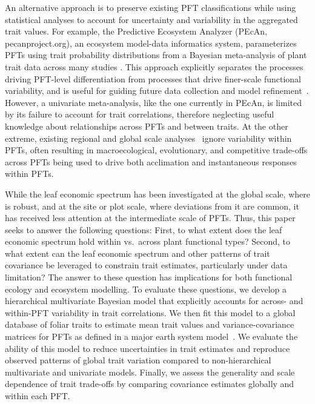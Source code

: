 An alternative approach is to preserve existing PFT classifications%
\cite[though potentially with finer taxonomic, functional, or spatial resolution, e.g.][]{boulangeat_improving_2012}
while using statistical analyses to account for uncertainty and variability in the aggregated trait values.
For example, the Predictive Ecosystem Analyzer (PEcAn, pecanproject.org), an ecosystem model-data informatics system, parameterizes PFTs using trait probability distributions from a Bayesian meta-analysis of plant trait data across many studies%
\cite{dietze_improving_2013,lebauer_facilitating_2013}.
This approach explicitly separates the processes driving PFT-level differentiation from processes that drive finer-scale functional variability,
and is useful for guiding future data collection and model refinement~\cite{dietze_quantitative_2014}.
However, a univariate meta-analysis, like the one currently in PEcAn, is limited by its failure to account for trait correlations, therefore neglecting useful knowledge about relationships across PFTs and between traits.
At the other extreme, existing regional and global scale analyses~\cite[e.g.][]{van_bodegom_going_2012,sakschewski_leaf_2015} ignore variability within PFTs, often resulting in macroecological, evolutionary, and competitive trade-offs across PFTs being used to drive both acclimation and instantaneous responses within PFTs.

While the leaf economic spectrum has been investigated at the global scale, where is robust, and at the site or plot scale, where deviations from it are common, it has received less attention at the intermediate scale of PFTs.
Thus, this paper seeks to answer the following questions:
First, to what extent does the leaf economic spectrum hold within vs.\ across plant functional types?
Second, to what extent can the leaf economic spectrum and other patterns of trait covariance be leveraged to constrain trait estimates, particularly under data limitation?
The answer to these question has implications for both functional ecology and ecosystem modelling.
To evaluate these questions, we develop a hierarchical multivariate Bayesian model that explicitly accounts for across- and within-PFT variability in trait correlations.
We then fit this model to a global database of foliar traits to estimate mean trait values and variance-covariance matrices for PFTs as defined in a major earth system model~\cite[Community Land Model, CLM,][]{clm45_note}.
We evaluate the ability of this model to reduce uncertainties in trait estimates and reproduce observed patterns of global trait variation compared to non-hierarchical multivariate and univariate models.
Finally, we assess the generality and scale dependence of trait trade-offs by comparing covariance estimates globally and within each PFT\@.
